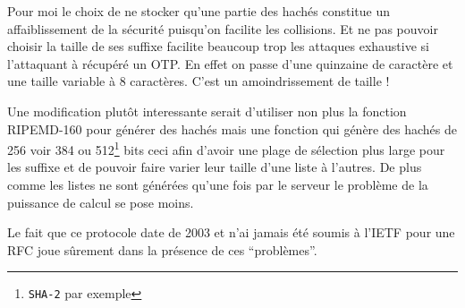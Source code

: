 \documentclass{../res/univ-projet}
\begin{document}
        Pour moi le choix de ne stocker qu'une partie des hachés constitue un affaiblissement de la sécurité puisqu'on facilite
    les collisions. Et ne pas pouvoir choisir la taille de ses suffixe facilite beaucoup trop les attaques exhaustive
    si l'attaquant à récupéré un OTP. En effet on passe d'une quinzaine de caractère et une taille variable à 8 caractères.
    C'est un amoindrissement de taille !

        Une modification plutôt interessante serait d'utiliser non plus la fonction RIPEMD-160 pour générer des hachés mais
    une fonction qui génère des hachés de 256 voir 384 ou 512\footnote{\verb?SHA-2? par exemple} bits ceci afin d'avoir une
    plage de sélection plus large pour les suffixe et de pouvoir faire varier leur taille d'une liste à l'autres.
    De plus comme les listes ne sont générées qu'une fois par le serveur le problème de la puissance de calcul se pose moins.

        Le fait que ce protocole date de 2003 et n'ai jamais été soumis à l'IETF pour une RFC joue sûrement dans la présence
    de ces ``problèmes''.
\end{document}
